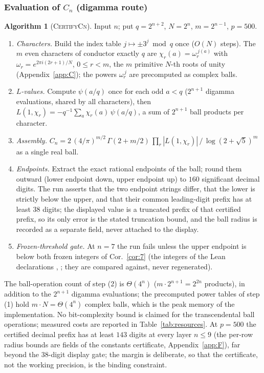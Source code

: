 \documentclass[11pt]{amsart}
\theoremstyle{remark}\newtheorem{remark}[theorem]{Remark}
\theoremstyle{definition}\newtheorem{definition}[theorem]{Definition}
\theoremstyle{definition}\newtheorem{algorithm}[theorem]{Algorithm}
\begin{document}
\subsubsection*{Evaluation of $C_n$ (digamma route)}
\begin{algorithm}[\textsc{CertifyCn}]\label{alg:cn}
Input $n$; put $q=2^{n+2}$, $N=2^n$, $m=2^{n-1}$, $p=500$.
\begin{enumerate}
\item[(1)] \emph{Characters.} Build the index table $j\mapsto\pm3^j\bmod q$ once ($O(N)$ steps). The $m$ even characters of conductor exactly $q$ are $\chi_r(a)=\omega_r^{\,j(a)}$ with $\omega_r=e^{2\pi i(2r+1)/N}$, $0\le r<m$, the $m$ primitive $N$-th roots of unity (Appendix~\ref{app:C}); the powers $\omega_r^{\,j}$ are precomputed as complex balls.
\item[(2)] \emph{$L$-values.} Compute $\psi(a/q)$ once for each odd $a<q$ ($2^{n+1}$ digamma evaluations, shared by all characters), then $L(1,\chi_r)=-q^{-1}\sum_{a}\chi_r(a)\,\psi(a/q)$, a sum of $2^{n+1}$ ball products per character.
\item[(3)] \emph{Assembly.} $C_n=2\,(4/\pi)^{m/2}\,\Gamma(2+m/2)\,\prod_r|L(1,\chi_r)|\,/\,\log(2+\sqrt5)^{m}$ as a single real ball.
\item[(4)] \emph{Endpoints.} Extract the exact rational endpoints of the ball; round them outward (lower endpoint down, upper endpoint up) to $160$ significant decimal digits. The run asserts that the two endpoint strings differ, that the lower is strictly below the upper, and that their common leading-digit prefix has at least $38$ digits; the displayed value is a truncated prefix of that certified prefix, so its only error is the stated truncation bound, and the ball radius is recorded as a separate field, never attached to the display.
\item[(5)] \emph{Frozen-threshold gate.} At $n=7$ the run fails unless the upper endpoint is below both frozen integers of Cor.~\ref{cor:7} (the integers of the Lean declarations , ; they are compared against, never regenerated).
\end{enumerate}
\end{algorithm}
The ball-operation count of step (2) is $\Theta(4^n)$ ($m\cdot2^{n+1}=2^{2n}$ products), in addition to the $2^{n+1}$ digamma evaluations; the precomputed power tables of step (1) hold $m\cdot N=\Theta(4^n)$ complex balls, which is the peak memory of the implementation. No bit-complexity bound is claimed for the transcendental ball operations; measured costs are reported in Table~\ref{tab:resources}. At $p=500$ the certified decimal prefix has at least $143$ digits at every layer $n\le9$ (the per-row radius bounds are fields of the constants certificate, Appendix~\ref{app:F}), far beyond the $38$-digit display gate; the margin is deliberate, so that the certificate, not the working precision, is the binding constraint.
\end{document}
